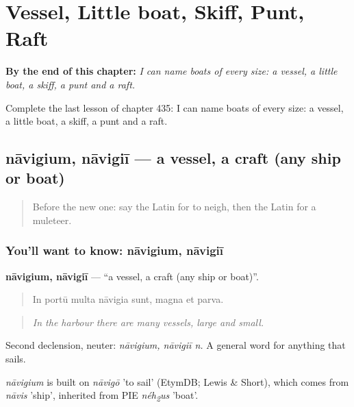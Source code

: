 
\chapter{Vessel, Little boat, Skiff, Punt, Raft}
\label{ch:la-vessel-little-boat-skiff-punt-raft}

\begin{chapteropening}
\textbf{By the end of this chapter:} \emph{I can name boats of every size: a vessel, a little boat, a skiff, a punt and a raft.}

Complete the last lesson of chapter 435: I can name boats of every size: a vessel, a little boat, a skiff, a punt and a raft.
\end{chapteropening}

\section[nāvigium, nāvigiī]{nāvigium, nāvigiī — a vessel, a craft (any ship or boat)}

\label{lesson:LA-C435-navigium}



\begin{quote}
Before the new one: say the Latin for to neigh, then the Latin for a muleteer.
\end{quote}

\subsection*{You'll want to know: nāvigium, nāvigiī}
\textbf{nāvigium, nāvigiī} — \textquotedblleft{}a vessel, a craft (any ship or boat)\textquotedblright{}.

\begin{quote}
In portū multa nāvigia sunt, magna et parva.
\end{quote}

\begin{quote}
\emph{In the harbour there are many vessels, large and small.}
\end{quote}

Second declension, neuter: \emph{nāvigium, nāvigiī n.} A general word for anything that sails.

\begin{cousinweb}
\emph{nāvigium} is built on \emph{nāvigō} 'to sail' (EtymDB; Lewis \& Short), which comes from \emph{nāvis} 'ship', inherited from PIE \emph{néh\textsubscript{2}us} 'boat'.
\end{cousinweb}


